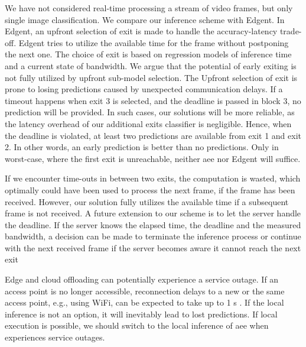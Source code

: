 We have not considered real-time processing a stream of video frames, but only single image classification. We compare our inference scheme with Edgent. In Edgent, an upfront selection of exit is made to handle the accuracy-latency trade-off. Edgent tries to utilize the available time for the frame without postponing the next one. The choice of exit is based on regression models of inference time and a current state of bandwidth.  We argue that the potential of early exiting is not fully utilized by upfront sub-model selection. The Upfront selection of exit is prone to losing predictions caused by unexpected communication delays. If a timeout happens when exit 3 is selected, and the deadline is passed in block 3, no prediction will be provided.  In such cases, our solutions will be more reliable, as the latency overhead of our additional exits classifier is negligible. Hence, when the deadline is violated, at least two predictions are available from exit 1 and exit 2. In other words, an early prediction is better than no predictions. Only in worst-case, where the first exit is unreachable, neither \gls{aee} nor Edgent will suffice. 

If we encounter time-outs in between two exits, the computation is wasted, which optimally could have been used to process the next frame, if the frame has been received. However, our solution fully utilizes the available time if a subsequent frame is not received. A future extension to our scheme is to let the server handle the deadline. If the server knows the elapsed time, the deadline and the measured bandwidth, a decision can be made to terminate the inference process or continue with the next received frame if the server becomes aware it cannot reach the next exit  

Edge and cloud offloading can potentially experience a service outage. If an access point is no longer accessible, reconnection delays to a new or the same access point, e.g., using WiFi, can be expected to take up to 1 s \cite{pei_why_2017}. If the local inference is not an option, it will inevitably lead to lost predictions. If local execution is possible, we should switch to the local inference of \gls{aee} when experiences service outages. 
